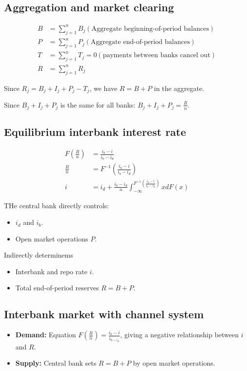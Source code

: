 \subsection{Aggregation and market clearing}
\begin{align*}
    B &= \sum_{j=1}^{n}B_j (\text{Aggregate beginning-of-period balances})\\
    P &= \sum_{j=1}^{n}P_j (\text{Aggregate end-of-period balances})\\
    T &= \sum_{j=1}^{n}T_j = 0 (\text{payments between banks cancel out})  \\
    R &= \sum_{j=1}^{n}R_j
\end{align*}

Since $R_j = B_j + I_j + P_j - T_j$, we have $R = B+P$ in the aggregate.

Since $B_j + I_j + P_j$ is the same for all banks: $B_j + I_j + P_j = \frac{R}{n}$.

\subsection{Equilibrium interbank interest rate}
\begin{align*}
    F\left(\frac{R}{n}\right) &= \frac{i_b - i}{i_b - i_d} \\
    \frac{R}{n} &= F^{-1}\left(\frac{i_b - i}{i_b - i_d}\right) \\
    i &= i_d + \frac{i_b - i_d}{n} \int_{-\infty}^{F^{-1}\left(\frac{i_b - i}{i_b - i_d}\right)} x dF(x)
\end{align*}

THe central bank directly controls:
\begin{itemize}
    \item $i_d$ and $i_b$.
    \item Open market operations $P$.
\end{itemize}
Indirectly determinems
\begin{itemize}
    \item Interbank and repo rate $i$.
    \item Total end-of-period reserves $R = B+P$.
\end{itemize}

\subsection{Interbank market with channel system}

\begin{itemize}
    \item \textbf{Demand:} Equation $F\left(\frac{R}{n}\right) = \frac{i_b - i}{i_{b-i_d}}$, giving a negative relationship between $i$ and $R$.
    \item \textbf{Supply:} Central bank sets $R = B+P$ by open market operations.
\end{itemize}

